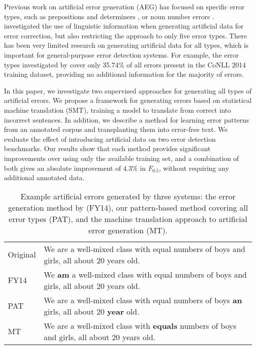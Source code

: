 \documentclass[11pt,letterpaper]{article}
\begin{document}
Previous work on artificial error generation (AEG) has focused on specific error types, such as prepositions and determiners \cite{Rozovskaya2010a,Rozovskaya2011a}, or noun number errors \cite{Brockett2006}.
 investigated the use of linguistic information when generating artificial data for error correction, but also restricting the approach to only five error types. 
There has been very limited research on generating artificial data for all types, which is important for general-purpose error detection systems.
For example, the error types investigated by  cover only 35.74\% of all errors present in the CoNLL 2014 training dataset, providing no additional information for the majority of errors.

In this paper, we investigate two supervised approaches for generating all types of artificial errors.
We propose a framework for generating errors based on statistical machine translation (SMT), training a model to translate from correct into incorrect sentences. In addition, we describe a method for learning error patterns from an annotated corpus and transplanting them into error-free text. We evaluate the effect of introducing artificial data on two error detection benchmarks.
Our results show that each method provides significant improvements over using only the available training set, and a combination of both gives an absolute improvement of 4.3\% in $F_{0.5}$, without requiring any additional annotated data.





\begin{table*}[t]
\setlength\tabcolsep{7pt}
\begin{tabular}{l|l} \hline
\normalsize
Original & We are a well-mixed class with equal numbers of boys and girls, all about 20 years old. \\
FY14 & We \textbf{am} a well-mixed class with equal numbers of boys and girls, all about 20 years old. \\
PAT & We are a well-mixed class with equal numbers of boys \textbf{an} girls, all about 20 \textbf{year} old. \\
MT & We are a well-mixed class with \textbf{equals} numbers of boys and girls, all about 20 years old. \\





\hline
\end{tabular}
\caption{Example artificial errors generated by three systems: the error generation method by  (FY14), our pattern-based method covering all error types (PAT), and the machine translation approach to artificial error generation (MT).}
\label{tab:examples}
\end{table*}
\end{document}
